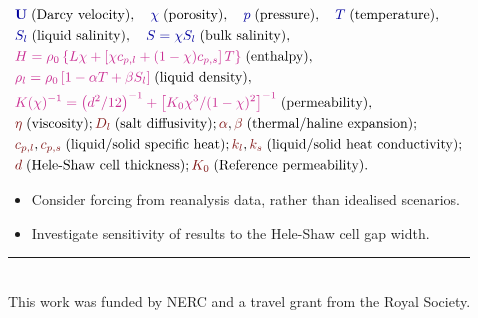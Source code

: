 \documentclass[landscape,24pt, a0paper,colspace=8mm,blockverticalspace=8mm]{tikzposter}
\newcommand{\varColor}[1]{\textcolor{dukeblue}{#1}}
\newcommand{\eqnColor}[1]{\textcolor{royalfuchsia}{#1}}
\newcommand{\paramColor}[1]{\textcolor{falured}{#1}}
\begin{document}
\begin{columns}
\begin{subcolumns}
{\begin{minipage}[t]{0.49\linewidth}
\begin{align}
\end{align} 
\end{minipage}
\hfill
\begin{minipage}[t][][b]{0.48\linewidth}
\vspace{-1.0\baselineskip}
\begin{align*}
&\varColor{\mathbf{U}}\; \text{(Darcy velocity)}, \quad \varColor{\chi} \; \text{(porosity)}, \quad \varColor{p} \; \text{(pressure)}, \quad \varColor{T} \; \text{(temperature)},\\
&\varColor{S_l} \; \text{(liquid salinity)}, \quad \varColor{S = \chi S_l} \; \text{(bulk salinity)},  \\
&\eqnColor{H = \rho_0 \left\{ L \chi + \left[\chi c_{p,l} + (1-\chi) c_{p,s}\right] T \right\}} \; \text{(enthalpy)}, \\
&\eqnColor{\rho_l = \rho_0 \left[1 - \alpha T + \beta S_l \right]} \; \text{(liquid density)}, \\
&\eqnColor{K(\chi)^{-1} = \left(d^2/12\right)^{-1} + \left[K_0 \chi^3 / (1-\chi)^2 \right]^{-1}} \; \text{(permeability)}, \\
&\paramColor{\eta} \; \text{(viscosity)}; \paramColor{D_l} \; \text{(salt diffusivity)}; \paramColor{\alpha}, \paramColor{\beta} \; \text{(thermal/haline expansion)}; \\
&\paramColor{c_{p,l}}, \paramColor{c_{p,s}} \; \text{(liquid/solid specific heat)}; \paramColor{k_l}, \paramColor{k_s} \; \text{(liquid/solid heat conductivity)}; \\
&\paramColor{d} \; \text{(Hele-Shaw cell thickness)}; \paramColor{K_0} \; \text{(Reference permeability)}.
\end{align*}
\end{minipage}

}
 

 
{

\begin{itemize}
\item Consider forcing from reanalysis data, rather than idealised scenarios.
\item Investigate sensitivity of results to the Hele-Shaw cell gap width.
\end{itemize}
\vspace{5pt}
\rule{\linewidth}{.4pt}
\vspace{5pt} \\
This work was funded by NERC and a travel grant from the Royal Society.
{
\fontsize{16}{15}\selectfont 
\renewcommand\refname{\vskip -2.5cm}

}}
\end{subcolumns}
\end{columns}
\end{document}
